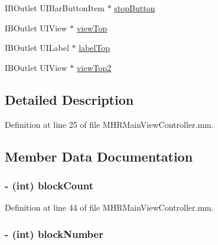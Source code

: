 \begin{DoxyCompactItemize}
I\+B\+Outlet U\+I\+Bar\+Button\+Item $\ast$ \hyperlink{category_m_h_r_main_view_controller_07_08_a0e349ec3fa2cecae6592c8d9489dedfe}{stop\+Button}
\item 
I\+B\+Outlet U\+I\+View $\ast$ \hyperlink{category_m_h_r_main_view_controller_07_08_a012367c6522cfb5d64c9d5dadcb272e2}{view\+Top}
\item 
I\+B\+Outlet U\+I\+Label $\ast$ \hyperlink{category_m_h_r_main_view_controller_07_08_a8b3917278570b1085bd6f73297f44383}{label\+Top}
\item 
I\+B\+Outlet U\+I\+View $\ast$ \hyperlink{category_m_h_r_main_view_controller_07_08_ae61668adf80d339aabb1c9dcb3085428}{view\+Top2}
\end{DoxyCompactItemize}


\subsection{Detailed Description}


Definition at line 25 of file M\+H\+R\+Main\+View\+Controller.\+mm.



\subsection{Member Data Documentation}
\hypertarget{category_m_h_r_main_view_controller_07_08_a58a5e815d93639db9e1ab9f1da8fa9f9}{
\subsubsection[{block\+Count}]{\setlength{\rightskip}{0pt plus 5cm}-\/ (int) block\+Count\hspace{0.3cm}{\ttfamily [protected]}}}\label{category_m_h_r_main_view_controller_07_08_a58a5e815d93639db9e1ab9f1da8fa9f9}


Definition at line 44 of file M\+H\+R\+Main\+View\+Controller.\+mm.

\hypertarget{category_m_h_r_main_view_controller_07_08_a228b693ffc5ea747c93a4206c5b8b98d}{
\subsubsection[{block\+Number}]{\setlength{\rightskip}{0pt plus 5cm}-\/ (int) block\+Number\hspace{0.3cm}{\ttfamily [protected]}}}\label{category_m_h_r_main_view_controller_07_08_a228b693ffc5ea747c93a4206c5b8b98d}


